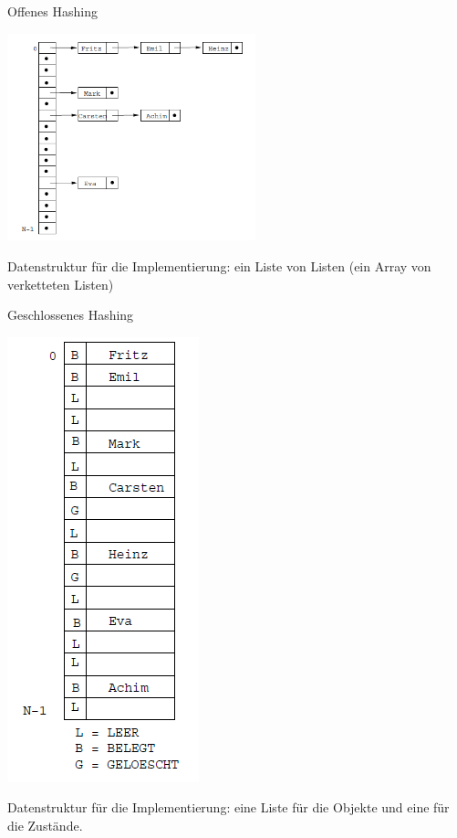 \documentclass{beamer}
\begin{document}
\begin{frame}[fragile]
Offenes Hashing \pause

\includegraphics[height=6cm]{bild2.png}  


Datenstruktur für die Implementierung: ein Liste von Listen (ein Array von verketteten Listen)

\end{frame}


\begin{frame}[fragile]
Geschlossenes Hashing \pause

\includegraphics[scale=0.6]{bild3.png}  

Datenstruktur für die Implementierung: eine Liste für die Objekte und eine für die Zustände.
\end{frame}
\end{document}
